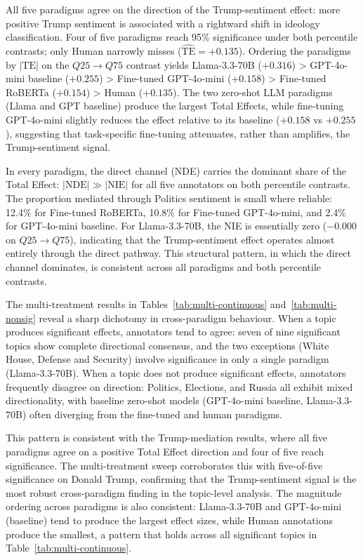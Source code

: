All five paradigms agree on the direction of the Trump-sentiment effect: more positive Trump sentiment is associated with a rightward shift in ideology classification. Four of five paradigms reach 95\% significance under both percentile contrasts; only Human narrowly misses ($\widehat{\text{TE}} = +0.135$). Ordering the paradigms by $|\text{TE}|$ on the $Q25 \to Q75$ contrast yields Llama-3.3-70B ($+0.316$) > GPT-4o-mini baseline ($+0.255$) > Fine-tuned GPT-4o-mini ($+0.158$) > Fine-tuned RoBERTa ($+0.154$) > Human ($+0.135$). The two zero-shot LLM paradigms (Llama and GPT baseline) produce the largest Total Effects, while fine-tuning GPT-4o-mini slightly reduces the effect relative to its baseline ($+0.158$ vs $+0.255$), suggesting that task-specific fine-tuning attenuates, rather than amplifies, the Trump-sentiment signal.

In every paradigm, the direct channel (NDE) carries the dominant share of the Total Effect: $|\text{NDE}| \gg |\text{NIE}|$ for all five annotators on both percentile contrasts. The proportion mediated through Politics sentiment is small where reliable: 12.4\% for Fine-tuned RoBERTa, 10.8\% for Fine-tuned GPT-4o-mini, and 2.4\% for GPT-4o-mini baseline. For Llama-3.3-70B, the NIE is essentially zero ($-0.000$ on $Q25 \to Q75$), indicating that the Trump-sentiment effect operates almost entirely through the direct pathway. This structural pattern, in which the direct channel dominates, is consistent across all paradigms and both percentile contrasts.

The multi-treatment results in Tables~\ref{tab:multi-continuous} and~\ref{tab:multi-nonsig} reveal a sharp dichotomy in cross-paradigm behaviour. When a topic produces significant effects, annotators tend to agree: seven of nine significant topics show complete directional consensus, and the two exceptions (White House, Defense and Security) involve significance in only a single paradigm (Llama-3.3-70B). When a topic does not produce significant effects, annotators frequently disagree on direction: Politics, Elections, and Russia all exhibit mixed directionality, with baseline zero-shot models (GPT-4o-mini baseline, Llama-3.3-70B) often diverging from the fine-tuned and human paradigms.

This pattern is consistent with the Trump-mediation results, where all five paradigms agree on a positive Total Effect direction and four of five reach significance. The multi-treatment sweep corroborates this with five-of-five significance on Donald Trump, confirming that the Trump-sentiment signal is the most robust cross-paradigm finding in the topic-level analysis. The magnitude ordering across paradigms is also consistent: Llama-3.3-70B and GPT-4o-mini (baseline) tend to produce the largest effect sizes, while Human annotations produce the smallest, a pattern that holds across all significant topics in Table~\ref{tab:multi-continuous}.

